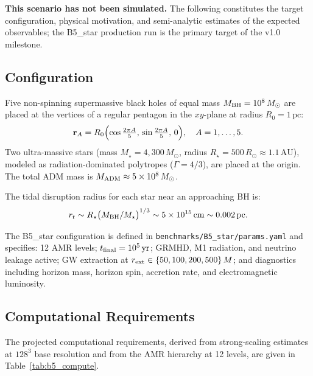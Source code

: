 \documentclass[aps,prd,twocolumn,superscriptaddress,nofootinbib,showpacs,
               longbibliography]{revtex4-2}
\newcommand{\code}[1]{\texttt{#1}}
\newcommand{\Msun}{M_\odot}
\newcommand{\Rsun}{R_\odot}
\begin{document}
\textbf{This scenario has not been simulated.} The following constitutes the
target configuration, physical motivation, and semi-analytic estimates of the
expected observables; the B5\_star production run is the primary target of
the v1.0 milestone.

\subsection{Configuration}
\label{sec:b5_config}

Five non-spinning supermassive black holes of equal mass
$M_{\rm BH} = 10^8\,\Msun$ are placed at the vertices of a regular
pentagon in the $xy$-plane at radius $R_0 = 1\,\text{pc}$:
\begin{equation}
  \mathbf{r}_A = R_0\Bigl(\cos\tfrac{2\pi A}{5},\,\sin\tfrac{2\pi A}{5},\,0\Bigr),
  \quad A = 1,\ldots,5.
\end{equation}
Two ultra-massive stars (mass $M_\star = 4{,}300\,\Msun$, radius
$R_\star = 500\,\Rsun \approx 1.1\,\text{AU}$), modeled as
radiation-dominated polytropes ($\Gamma = 4/3$), are placed at the origin.
The total ADM mass is $M_{\rm ADM} \approx 5\times10^8\,\Msun$.

The tidal disruption radius for each star near an approaching BH is:
\begin{equation}
  r_t \sim R_\star\bigl(M_{\rm BH}/M_\star\bigr)^{1/3}
    \sim 5\times10^{15}\,\text{cm} \sim 0.002\,\text{pc}.
\end{equation}

The B5\_star configuration is defined in
\code{benchmarks/B5\_star/params.yaml} and specifies:
12 AMR levels; $t_{\rm final} = 10^5\,\text{yr}$; GRMHD, M1 radiation,
and neutrino leakage active; GW extraction at
$r_{\rm ext} \in \{50, 100, 200, 500\}\,M$; and diagnostics including
horizon mass, horizon spin, accretion rate, and electromagnetic luminosity.

\subsection{Computational Requirements}
\label{sec:b5_compute}

The projected computational requirements, derived from strong-scaling
estimates at $128^3$ base resolution and from the AMR hierarchy at 12 levels,
are given in Table~\ref{tab:b5_compute}.
\end{document}
